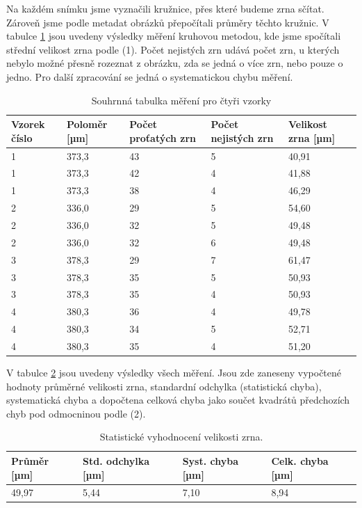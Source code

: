Na každém snímku jsme vyznačili kružnice, přes které budeme zrna sčítat. Zároveň jsme podle metadat obrázků přepočítali průměry těchto kružnic. V tabulce \ref{tab:mereni_zrno} jsou uvedeny výsledky měření kruhovou metodou, kde jsme spočítali střední velikost zrna podle (1). Počet nejistých zrn udává počet zrn, u kterých nebylo možné přesně rozeznat z obrázku, zda se jedná o více zrn, nebo pouze o jedno. Pro další zpracování se jedná o systematickou chybu měření.

\begin{table}[!h]
    \centering
    \renewcommand{\arraystretch}{1.4}
    \setlength{\tabcolsep}{10pt}
    \begin{tabular}{lllll}
        \hline
        \textbf{Vzorek číslo} & \textbf{Poloměr [µm]} & \textbf{Počet proťatých zrn} & \textbf{Počet nejistých zrn} & \textbf{Velikost zrna [µm]} \\
        \hline
        1 & 373{,}3 & 43 & 5 & 40{,}91 \\
        1 & 373{,}3 & 42 & 4 & 41{,}88 \\
        1 & 373{,}3 & 38 & 4 & 46{,}29 \\
        \hline
        2 & 336,0 & 29 & 5 & 54{,}60 \\
        2 & 336,0 & 32 & 5 & 49{,}48 \\
        2 & 336,0 & 32 & 6 & 49{,}48 \\
        \hline
        3 & 378{,}3 & 29 & 7 & 61{,}47 \\
        3 & 378{,}3 & 35 & 5 & 50{,}93 \\
        3 & 378{,}3 & 35 & 4 & 50{,}93 \\
        \hline
        4 & 380{,}3 & 36 & 4 & 49{,}78 \\
        4 & 380{,}3 & 34 & 5 & 52{,}71 \\
        4 & 380{,}3 & 35 & 4 & 51{,}20 \\
        \hline
    \end{tabular}
    \caption{Souhrnná tabulka měření pro čtyři vzorky}
    \label{tab:mereni_zrno}
\end{table}

V tabulce \ref{tab:statistika_zrna} jsou uvedeny výsledky všech měření. Jsou zde zaneseny vypočtené hodnoty průměrné velikosti zrna, standardní odchylka (statistická chyba), systematická chyba a dopočtena celková chyba jako součet kvadrátů předchozích chyb pod odmocninou podle (2).

\begin{table}[!h]
    \centering
    \renewcommand{\arraystretch}{1.3}
    \setlength{\tabcolsep}{8pt}
    \begin{tabular}{llll}
        \hline
        \textbf{Průměr [µm]} & \textbf{Std. odchylka [µm]} & \textbf{Syst. chyba [µm]} & \textbf{Celk. chyba [µm]} \\
        \hline
        49{,}97 & 5{,}44 & 7{,}10 & 8{,}94 \\
        \hline
    \end{tabular}
    \caption{Statistické vyhodnocení velikosti zrna.}
    \label{tab:statistika_zrna}
\end{table}

